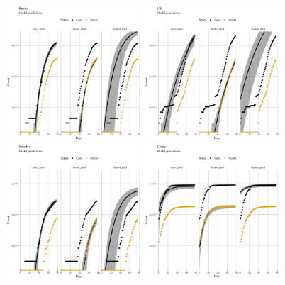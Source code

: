 \documentclass[a4paper]{tufte-handout}
\begin{document}
\begin{figure}
\begin{center}
    \includegraphics[width=0.45\textwidth]{../figs/model_pred_Gomp_ESP.pdf}
    \includegraphics[width=0.45\textwidth]{../figs/model_pred_Gomp_USA.pdf}
    \includegraphics[width=0.45\textwidth]{../figs/model_pred_Gomp_SWE.pdf}
    \includegraphics[width=0.45\textwidth]{../figs/model_pred_Gomp_CHN.pdf}

\end{center}
\end{figure}
\end{document}
